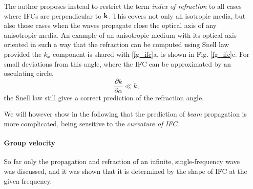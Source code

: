 The author proposes instead to restrict the term \textit{index of refraction} to all cases where IFCs are perpendicular to ${\mathbf{k}}$. This covers not only all isotropic media, but also those cases when the waves propagate close the optical axis of any anisotropic media. An example of an anisotropic medium with its optical axis oriented in such a way that the refraction can be computed using Snell law provided the $k_x$ component is shared with \ref{fg_ifc}a, is shown in Fig. \ref{fg_ifc}c. For small deviations from this angle, where the IFC can be approximated by an osculating circle, 
\begin{equation} \frac{\partial k}{\partial \alpha} \ll k,\label{eq_osculating}\end{equation}
the Snell law still gives a correct prediction of the refraction angle. 

We will however show in the following that the prediction of \textit{beam} propagation is more complicated, being sensitive to the \textit{curvature of IFC}. 

\paragraph{Group velocity}  %
So far only the propagation and refraction of an infinite, single-frequency wave was discussed, and it was shown that it is determined by the shape of IFC at the given frequency. %

